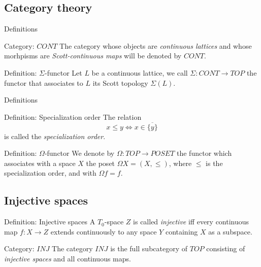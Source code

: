 \documentclass{beamer}
\begin{document}
\subsection{Category theory}
\begin{frame}{Definitions}
\begin{block}{Category: $CONT$}
The category whose objects are \emph{continuous lattices} and whose morhpisms are \emph{Scott-continuous maps} will be denoted by $CONT$.
\end{block}

\begin{block}{Definition: $\Sigma$-functor}
Let $L$ be a continuous lattice, we call $\Sigma: CONT \rightarrow TOP$ the functor that associates to $L$ its Scott topology $\Sigma(L)$.
\end{block}

\end{frame}
\begin{frame}{Definitions}
\begin{block}{Definition: Specialization order}
The relation $$x\leq y \Longleftrightarrow x \in \overline{\{y\}}$$
is called the \emph{specialization order}.
\end{block}

\begin{block}{Definition: $\Omega$-functor}
We denote by $\Omega: TOP \to POSET$ the functor which associates with a space $X$ the poset $\Omega X = (X, \leq)$, where $\leq$ is the specialization order, and with $\Omega f = f$.
\end{block}

\end{frame}
\subsection{Injective spaces}
\begin{frame}
\begin{block}{Definition: Injective spaces}
A $T_0$-space $Z$ is called \emph{injective} iff every continuous map $f: X \rightarrow Z$ extends continuously to any space $Y$ containing $X$ as a subspace.
 \begin{center}
 \end{center}
\end{block}

\begin{block}{Category: $INJ$}
The category $INJ$ is the full subcategory of $TOP$ consisting of \emph{injective spaces} and all continuous maps.
\end{block}
\end{frame}
\end{document}
